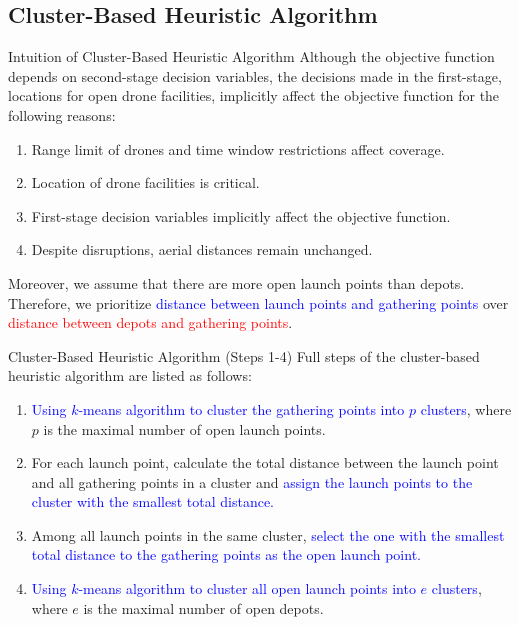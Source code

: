 \documentclass[aspectratio=169]{beamer}
\begin{document}
\subsection{Cluster-Based Heuristic Algorithm}
\begin{frame}{Intuition of Cluster-Based Heuristic Algorithm}
Although the objective function depends on second-stage decision variables, the decisions made in the first-stage, locations for open drone facilities, implicitly affect the objective function for the following reasons:
\begin{enumerate}[label=\arabic*.]
    \item Range limit of drones and time window restrictions affect coverage.
    \item Location of drone facilities is critical.
    \item First-stage decision variables implicitly affect the objective function.
    \item Despite disruptions, aerial distances remain unchanged.
\end{enumerate}
\vspace{1em}
Moreover, we assume that there are more open launch points than depots. Therefore, we prioritize \textcolor{blue}{distance between launch points and gathering points} over \textcolor{red}{distance between depots and gathering points}.
\end{frame}

\begin{frame}{Cluster-Based Heuristic Algorithm (Steps 1-4)}
\Large
Full steps of the cluster-based heuristic algorithm are listed as follows:
\normalsize
\vspace{1em}
    \begin{enumerate}[itemsep=0em]
        \item \textcolor{blue}{Using $k$-means algorithm to cluster the gathering points into $p$ clusters}, where $p$ is the maximal number of open launch points.
        \item For each launch point, calculate the total distance between the launch point and all gathering points in a cluster and \textcolor{blue}{assign the launch points to the cluster with the smallest total distance.}
        \item Among all launch points in the same cluster, \textcolor{blue}{select the one with the smallest total distance to the gathering points as the open launch point.}
        \item \textcolor{blue}{Using $k$-means algorithm to cluster all open launch points into $e$ clusters}, where $e$ is the maximal number of open depots.
    \end{enumerate}
\end{frame}
\end{document}
